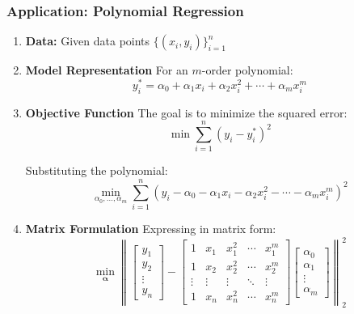 \subsubsection{Application: Polynomial Regression}
\begin{example}
    \begin{enumerate}
        \item \textbf{Data:} Given data points \( \{(x_i, y_i)\}_{i=1}^n \)
        \item \textbf{Model Representation} For an $m$-order polynomial:
        \[
        y_i^* = \alpha_0 + \alpha_1 x_i + \alpha_2 x_i^2 + \cdots + \alpha_m x_i^m
        \]
    
        \item \textbf{Objective Function} The goal is to minimize the squared error:
        \[
        \min \sum_{i=1}^n \left( y_i - y_i^* \right)^2
        \]
    
        Substituting the polynomial:
        \[
        \min_{\alpha_0, \dots, \alpha_m} \sum_{i=1}^n \left( y_i - \alpha_0 - \alpha_1 x_i - \alpha_2 x_i^2 - \cdots - \alpha_m x_i^m \right)^2
        \]
    
        \item \textbf{Matrix Formulation} Expressing in matrix form:
        \[
        \min_{\boldsymbol{\alpha}} 
        \left\| 
        \begin{bmatrix} 
        y_1 \\ 
        y_2 \\ 
        \vdots \\ 
        y_n 
        \end{bmatrix} 
        - 
        \begin{bmatrix} 
        1 & x_1 & x_1^2 & \cdots & x_1^m \\ 
        1 & x_2 & x_2^2 & \cdots & x_2^m \\ 
        \vdots & \vdots & \vdots & \ddots & \vdots \\ 
        1 & x_n & x_n^2 & \cdots & x_n^m 
        \end{bmatrix} 
        \begin{bmatrix} 
        \alpha_0 \\ 
        \alpha_1 \\ 
        \vdots \\ 
        \alpha_m 
        \end{bmatrix} 
        \right\|_2^2
        \]
    

\end{enumerate}
\end{example}
